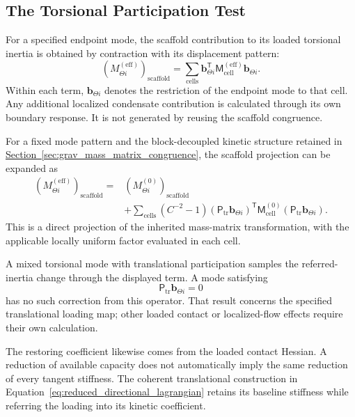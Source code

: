 \subsection{The Torsional Participation Test}

For a specified endpoint mode, the scaffold contribution to its loaded torsional inertia is obtained by contraction with its displacement pattern:
\begin{equation}
    \boxed{
    \left(M_{\Theta i}^{(\mathrm{eff})}\right)_{\mathrm{scaffold}}
    =\sum_{\mathrm{cells}}
    \mathbf b_{\Theta i}^{\mathsf T}
    \mathsf M_{\mathrm{cell}}^{(\mathrm{eff})}
    \mathbf b_{\Theta i}
    }.
\end{equation}
Within each term, $\mathbf b_{\Theta i}$ denotes the restriction of the endpoint mode to that cell. Any additional localized condensate contribution is calculated through its own boundary response. It is not generated by reusing the scaffold congruence.

For a fixed mode pattern and the block-decoupled kinetic structure retained in \hyperref[sec:grav_mass_matrix_congruence]{Section~\ref*{sec:grav_mass_matrix_congruence}}, the scaffold projection can be expanded as
\begin{equation}
    \begin{aligned}
    \left(M_{\Theta i}^{(\mathrm{eff})}\right)_{\mathrm{scaffold}}
    ={}&\left(M_{\Theta i}^{(0)}\right)_{\mathrm{scaffold}}\\
    &+\sum_{\mathrm{cells}}(C^{-2}-1)
      (\mathsf P_{\mathrm{tr}}\mathbf b_{\Theta i})^{\mathsf T}
      \mathsf M_{\mathrm{cell}}^{(0)}
      (\mathsf P_{\mathrm{tr}}\mathbf b_{\Theta i}).
    \end{aligned}
\end{equation}
This is a direct projection of the inherited mass-matrix transformation, with the applicable locally uniform factor evaluated in each cell.

A mixed torsional mode with translational participation samples the referred-inertia change through the displayed term. A mode satisfying
\begin{equation}
    \mathsf P_{\mathrm{tr}}\mathbf b_{\Theta i}=0
\end{equation}
has no such correction from this operator. That result concerns the specified translational loading map; other loaded contact or localized-flow effects require their own calculation.

The restoring coefficient likewise comes from the loaded contact Hessian. A reduction of available capacity does not automatically imply the same reduction of every tangent stiffness. The coherent translational construction in Equation~\eqref{eq:reduced_directional_lagrangian} retains its baseline stiffness while referring the loading into its kinetic coefficient.

